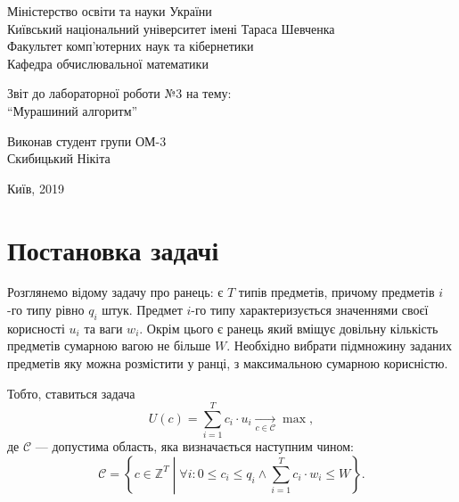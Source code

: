 \documentclass[a4paper, 12pt]{article}
\numberwithin{equation}{subsection}
\newcommand{\Sum}{\displaystyle\sum\limits}
\newcommand{\ZZ}{\mathbb{Z}}
\numberwithin{equation}{section}
\begin{document}
\begin{center}
\hfill \break
	Міністерство освіти та науки України \\
	Київський національний університет імені Тараса Шевченка \\ 
	Факультет комп'ютерних наук та кібернетики \\
	Кафедра обчислювальної математики
\end{center}

\vfill 

\begin{center}
	\large{
		Звіт до лабораторної роботи №3 на тему: \\ 
		``Мурашиний алгоритм''
	}
\end{center}

\vfill 

\begin{flushright}
	Виконав студент групи ОМ-3 \\
	Скибицький Нікіта
\end{flushright}

\vfill 

\begin{center}
    Київ, 2019
\end{center}

\thispagestyle{empty} 

\newpage

\tableofcontents

\section{Постановка задачі}

Розглянемо відому задачу про ранець: є $T$ типів предметів, причому предметів $i$-го типу рівно $q_i$ штук. Предмет $i$-го типу характеризується значеннями своєї корисності $u_i$ та ваги $w_i$. Окрім цього є ранець який вміщує довільну кількість предметів сумарною вагою не більше $W$. Необхідно вибрати підмножину заданих предметів яку можна розмістити у ранці, з максимальною сумарною корисністю. \medskip

Тобто, ставиться задача
\begin{equation}
	U(c) = \Sum_{i = 1}^T c_i \cdot u_i \xrightarrow[c \in \mathcal{C}]{} \max,
\end{equation}
де $\mathcal{C}$ --- допустима область, яка визначається наступним чином:
\begin{equation}
	\mathcal{C} = \left\{ c \in \ZZ^T \middle| \forall i: 0 \le c_i \le q_i \land \Sum_{i = 1}^T c_i \cdot w_i \le W \right\}.
\end{equation}
\end{document}
